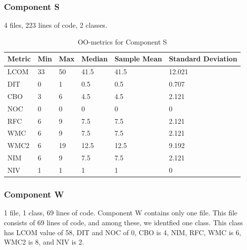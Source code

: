 \subsubsection{Component S}
4 files, 223 lines of code, 2 classes.
\begin{table}[]
\centering
\caption{OO-metrics for Component S}
\label{tab:oometrics-sys}
\begin{tabular}{|l|l|l|l|l|l|}
\hline
\textbf{Metric} & \textbf{Min} & \textbf{Max} & \textbf{Median} & \textbf{Sample Mean} & \textbf{Standard Deviation} \\ \hline
LCOM            & 33           & 50           & 41.5            & 41.5                 & 12.021                      \\ \hline
DIT             & 0            & 1            & 0.5             & 0.5                  & 0.707                       \\ \hline
CBO             & 3            & 6            & 4.5             & 4.5                  & 2.121                       \\ \hline
NOC             & 0            & 0            & 0               & 0                    & 0                           \\ \hline
RFC             & 6            & 9            & 7.5             & 7.5                  & 2.121                       \\ \hline
WMC             & 6            & 9            & 7.5             & 7.5                  & 2.121                       \\ \hline
WMC2            & 6           & 19            & 12.5            & 12.5                 & 9.192                         \\ \hline
NIM             & 6            & 9            & 7.5             & 7.5                  & 2.121                       \\ \hline
NIV             & 1            & 1            & 1               & 1                    & 0                           \\ \hline
\end{tabular}
\end{table}






\subsubsection{Component W}
1 file, 1 class, 69 lines of code. 
Component W contains only one file. This file consists of 69 lines of code, and among these, we identfied one class. This class has LCOM value of 58, DIT and NOC of 0, CBO is 4, NIM, RFC, WMC is 6, WMC2 is 8, and NIV is 2. 



